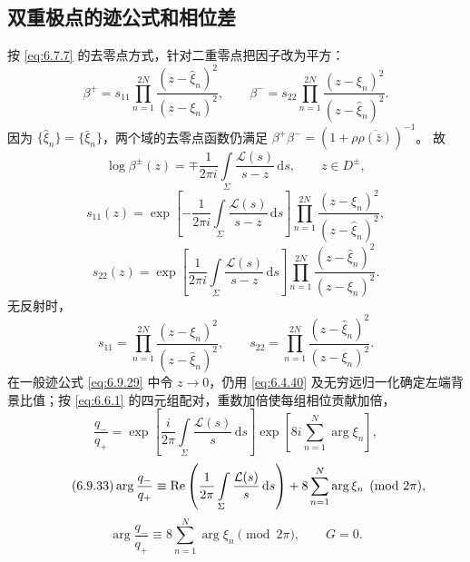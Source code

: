 \documentclass[lang=cn,scheme=chinese,mode=simple,device=normal,color=blue,
math=cm,thmcnt=section,12pt]{elegantbook}
\newcommand{\dd}{\,\mathrm{d}}
\newcommand{\conj}[1]{\overline{#1}}
\newcommand{\eqq}[2]{\tag{#1}\label{eq:#1}#2}
\begin{document}
\subsection{双重极点的迹公式和相位差}
按 \eqref{eq:6.7.7} 的去零点方式，针对二重零点把因子改为平方：
\begin{equation}\eqq{6.9.27}{\beta^+=s_{11}\prod\limits_{n=1}^{2N}
        \dfrac{(z-\widehat\xi_n)^2}{(z-\xi_n)^2},\qquad
        \beta^-=s_{22}\prod\limits_{n=1}^{2N}\dfrac{(z-\xi_n)^2}{(z-\widehat\xi_n)^2}.}\end{equation}
因为 $\{\widehat\xi_n\}=\{\bar\xi_n\}$，两个域的去零点函数仍满足
$\beta^+\beta^-=(1+\rho\conj{\rho(\bar z)})^{-1}$。
故
\begin{equation}\eqq{6.9.28}{\log\beta^\pm(z)=\mp\dfrac{1}{2\pi i}
        \int\limits_\Sigma\dfrac{\mathcal L(s)}{s-z}\dd s,\qquad z\in D^\pm,}\end{equation}
\begin{equation}\eqq{6.9.29}{s_{11}(z)=
        \exp\left[-\dfrac{1}{2\pi i}\int\limits_\Sigma\dfrac{\mathcal L(s)}{s-z}\dd s\right]
        \prod\limits_{n=1}^{2N}\dfrac{(z-\xi_n)^2}{(z-\widehat\xi_n)^2},}\end{equation}
\begin{equation}\eqq{6.9.30}{s_{22}(z)=
        \exp\left[\dfrac{1}{2\pi i}\int\limits_\Sigma\dfrac{\mathcal L(s)}{s-z}\dd s\right]
        \prod\limits_{n=1}^{2N}\dfrac{(z-\widehat\xi_n)^2}{(z-\xi_n)^2}.}\end{equation}
无反射时，
\begin{equation}\eqq{6.9.31}{s_{11}=\prod\limits_{n=1}^{2N}\dfrac{(z-\xi_n)^2}{(z-\widehat\xi_n)^2},\qquad
        s_{22}=\prod\limits_{n=1}^{2N}\dfrac{(z-\widehat\xi_n)^2}{(z-\xi_n)^2}.}\end{equation}
在一般迹公式 \eqref{eq:6.9.29} 中令 $z\to0$，仍用 \eqref{eq:6.4.40} 及无穷远归一化确定左端背景比值；按 \eqref{eq:6.6.1} 的四元组配对，重数加倍使每组相位贡献加倍，
\begin{equation}\eqq{6.9.32}{\dfrac{q_-}{q_+}=
        \exp\left[\dfrac{i}{2\pi}\int\limits_\Sigma\dfrac{\mathcal L(s)}{s}\dd s\right]
        \exp\left[8i\sum\limits_{n=1}^N\arg\xi_n\right],}\end{equation}
\begin{equation}\eqq{6.9.33}{\arg\dfrac{q_-}{q_+}\equiv
        \Ree\left(\dfrac{1}{2\pi}\int\limits_\Sigma\dfrac{\mathcal L(s)}{s}\dd s\right)
        +8\sum\limits_{n=1}^N\arg\xi_n\pmod{2\pi},}\end{equation}
\begin{equation}\eqq{6.9.34}{\arg\dfrac{q_-}{q_+}\equiv8\sum\limits_{n=1}^N\arg\xi_n\pmod{2\pi},\qquad G=0.}\end{equation}
\end{document}
